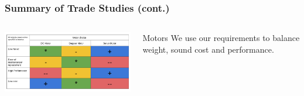 \documentclass[aspectratio=169]{beamer}
\begin{document}
\begin{frame}
    \frametitle{Summary of Trade Studies (cont.)}

    \begin{columns}
        \begin{column}{0.70\textwidth}
            \includegraphics[width=10.5cm]{MotorTradeStudy}
        \end{column}

        \begin{column}{0.28\textwidth}
            \begin{block}{Motors}
                We use our requirements to balance weight, sound
                cost and performance.
            \end{block}
        \end{column}
    \end{columns}

\end{frame}
\end{document}
